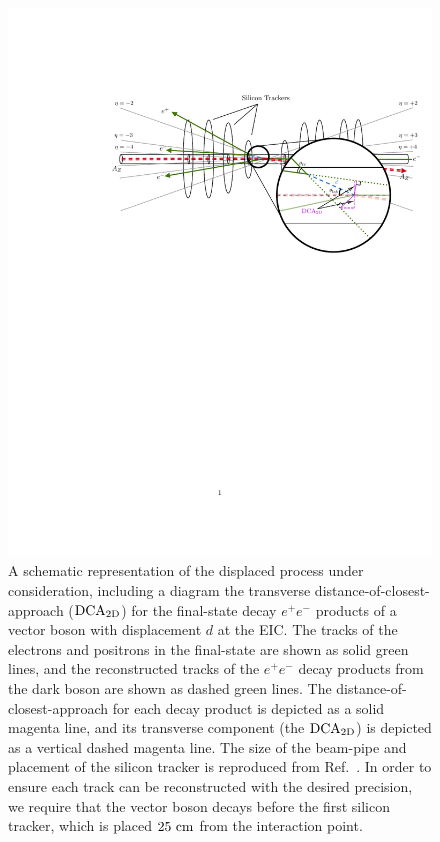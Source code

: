 \begin{figure}[t!]
    \centering
    \includegraphics[width=0.9\linewidth]{figures/chapter6/DCA2D_ePIC.pdf}
    \caption[A schematic representing the proposed ePIC detector at the EIC, along with a depiction of the distance-of-closest approach.]{A schematic representation of the displaced process under consideration, including a diagram the transverse distance-of-closest-approach (${\rm DCA}_{\rm 2D}$) for the final-state decay $e^+e^-$ products of a vector boson with displacement $d$ at the EIC. The tracks of the electrons and positrons in the final-state are shown as solid green lines, and the reconstructed tracks of the $e^+e^-$ decay products from the dark boson are shown as dashed green lines. The distance-of-closest-approach for each decay product is depicted as a solid magenta line, and its transverse component (the ${\rm DCA}_{\rm 2D}$) is depicted as a vertical dashed magenta line. The size of the beam-pipe and placement of the silicon tracker is reproduced from Ref.~\cite{Adkins:2022jfp}. In order to ensure each track can be reconstructed with the desired precision, we require that the vector boson decays before the first silicon tracker, which is placed $25~{\rm cm}$ from the interaction point.}
    \label{fig:DCA2D}
\end{figure}

